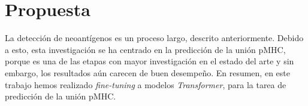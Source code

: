 \chapter{Propuesta}
\label{cap:propuesta}




La detección de neoantígenos es un proceso largo, descrito anteriormente. Debido a esto, esta investigación se ha centrado en la predicción de la unión pMHC, porque es una de las etapas con mayor investigación en el estado del arte y sin embargo, los resultados aún carecen de buen desempeño. En resumen, en este trabajo hemos realizado \textit{fine-tuning} a modelos \textit{Transformer}, para la tarea de predicción de la unión pMHC.




